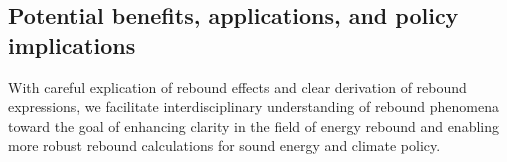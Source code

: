\documentclass[12pt]{article}    %
\begin{document}
\subsection*{Potential benefits, applications, and policy implications}
\label{sec:benefits}

With
careful explication of rebound effects and 
clear derivation of rebound expressions,
we facilitate interdisciplinary understanding of rebound phenomena
toward the goal of enhancing clarity in the field of energy rebound and
enabling more robust rebound calculations
for sound energy and climate policy.
\end{document}
